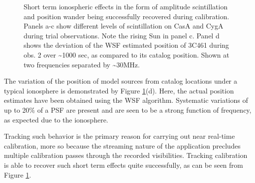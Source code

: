 \documentclass{aa}
\begin{document}
\begin{figure}[tbh]

\caption{\label{fig:Estimated-flux-of}Short term ionospheric effects in the form
  of amplitude  scintillation and  position wander being  successfully recovered
  during calibration. Panels a-c show  different levels of scintillation on CasA
  and CygA  during trial observations. Note the  rising Sun in panel  c. Panel d
  shows the deviation of the WSF  estimated position of 3C461 during obs. 2 over
  \textasciitilde{}1000 sec, as  compared to its catalog position.  Shown at two
  frequencies separated by \textasciitilde{}30MHz.}
\end{figure}


The variation  of the position of  model sources from catalog  locations under a
typical  ionosphere is  demonstrated  by Figure  \ref{fig:Estimated-flux-of}(d).
Here,  the  actual   position  estimates  have  been  obtained   using  the  WSF
algorithm. Systematic variations of up to 20\% of a PSF are present and are seen
to be a strong function of frequency, as expected due to the ionosphere.

Tracking such  behavior is the primary  reason for carrying  out near real-time
calibration, more so  because the streaming nature of  the application precludes
multiple  calibration   passes  through  the   recorded  visibilities.  Tracking
calibration is  able to recover such  short term effects  quite successfully, as
can be seen from Figure \ref{fig:Estimated-flux-of}.
\end{document}
